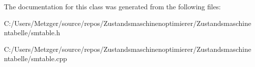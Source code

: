 The documentation for this class was generated from the following files\+:\begin{DoxyCompactItemize}
\item 
C\+:/\+Users/\+Metzger/source/repos/\+Zustandsmaschinenoptimierer/\+Zustandsmaschinentabelle/smtable.\+h\item 
C\+:/\+Users/\+Metzger/source/repos/\+Zustandsmaschinenoptimierer/\+Zustandsmaschinentabelle/smtable.\+cpp\end{DoxyCompactItemize}
